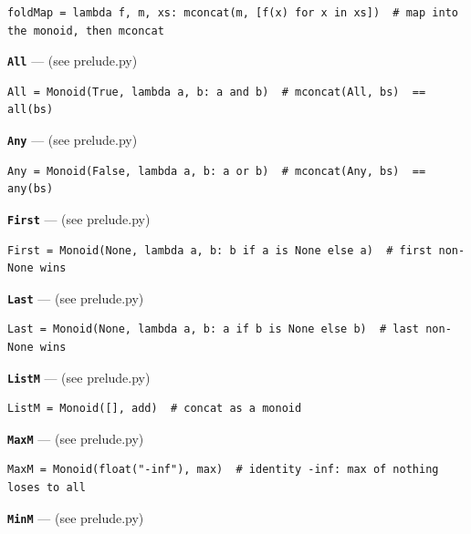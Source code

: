 \documentclass[10pt,letterpaper]{book}
\begin{document}
\begin{lstlisting}[style=ex]
foldMap = lambda f, m, xs: mconcat(m, [f(x) for x in xs])  # map into the monoid, then mconcat
\end{lstlisting}

\textbf{\texttt{All}}\label{def:All} --- (see prelude.py)

\begin{lstlisting}[style=ex]
All = Monoid(True, lambda a, b: a and b)  # mconcat(All, bs)  == all(bs)
\end{lstlisting}
\textbf{\texttt{Any}}\label{def:Any} --- (see prelude.py)

\begin{lstlisting}[style=ex]
Any = Monoid(False, lambda a, b: a or b)  # mconcat(Any, bs)  == any(bs)
\end{lstlisting}
\textbf{\texttt{First}}\label{def:First} --- (see prelude.py)

\begin{lstlisting}[style=ex]
First = Monoid(None, lambda a, b: b if a is None else a)  # first non-None wins
\end{lstlisting}
\textbf{\texttt{Last}}\label{def:Last} --- (see prelude.py)

\begin{lstlisting}[style=ex]
Last = Monoid(None, lambda a, b: a if b is None else b)  # last non-None wins
\end{lstlisting}
\textbf{\texttt{ListM}}\label{def:ListM} --- (see prelude.py)

\begin{lstlisting}[style=ex]
ListM = Monoid([], add)  # concat as a monoid
\end{lstlisting}
\textbf{\texttt{MaxM}}\label{def:MaxM} --- (see prelude.py)

\begin{lstlisting}[style=ex]
MaxM = Monoid(float("-inf"), max)  # identity -inf: max of nothing loses to all
\end{lstlisting}
\textbf{\texttt{MinM}}\label{def:MinM} --- (see prelude.py)
\end{document}
